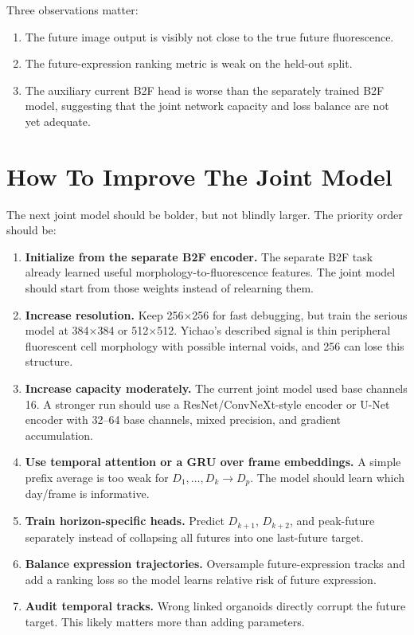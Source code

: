 \documentclass[11pt]{article}
\begin{document}
Three observations matter:

\begin{enumerate}
\item The future image output is visibly not close to the true future fluorescence.
\item The future-expression ranking metric is weak on the held-out split.
\item The auxiliary current B2F head is worse than the separately trained B2F model, suggesting that the joint network capacity and loss balance are not yet adequate.
\end{enumerate}

\section{How To Improve The Joint Model}

The next joint model should be bolder, but not blindly larger. The priority order should be:

\begin{enumerate}
\item \textbf{Initialize from the separate B2F encoder.} The separate B2F task already learned useful morphology-to-fluorescence features. The joint model should start from those weights instead of relearning them.
\item \textbf{Increase resolution.} Keep 256$\times$256 for fast debugging, but train the serious model at 384$\times$384 or 512$\times$512. Yichao's described signal is thin peripheral fluorescent cell morphology with possible internal voids, and 256 can lose this structure.
\item \textbf{Increase capacity moderately.} The current joint model used base channels 16. A stronger run should use a ResNet/ConvNeXt-style encoder or U-Net encoder with 32--64 base channels, mixed precision, and gradient accumulation.
\item \textbf{Use temporal attention or a GRU over frame embeddings.} A simple prefix average is too weak for $D_1,\ldots,D_k \rightarrow D_p$. The model should learn which day/frame is informative.
\item \textbf{Train horizon-specific heads.} Predict $D_{k+1}$, $D_{k+2}$, and peak-future separately instead of collapsing all futures into one last-future target.
\item \textbf{Balance expression trajectories.} Oversample future-expression tracks and add a ranking loss so the model learns relative risk of future expression.
\item \textbf{Audit temporal tracks.} Wrong linked organoids directly corrupt the future target. This likely matters more than adding parameters.
\end{enumerate}
\end{document}
